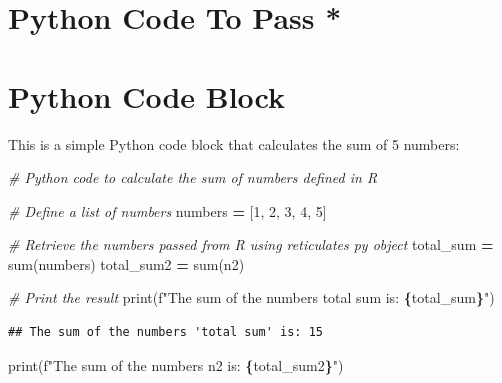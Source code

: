 \documentclass[
  12 pt,
  a4paper,
]{book}
\newenvironment{Shaded}{\begin{snugshade}}{\end{snugshade}}
\newcommand{\BuiltInTok}[1]{#1}
\newcommand{\CommentTok}[1]{\textcolor[rgb]{0.56,0.35,0.01}{\textit{#1}}}
\newcommand{\DecValTok}[1]{\textcolor[rgb]{0.00,0.00,0.81}{#1}}
\newcommand{\NormalTok}[1]{#1}
\newcommand{\OperatorTok}[1]{\textcolor[rgb]{0.81,0.36,0.00}{\textbf{#1}}}
\newcommand{\OtherTok}[1]{\textcolor[rgb]{0.56,0.35,0.01}{#1}}
\newcommand{\SpecialCharTok}[1]{\textcolor[rgb]{0.81,0.36,0.00}{\textbf{#1}}}
\newcommand{\SpecialStringTok}[1]{\textcolor[rgb]{0.31,0.60,0.02}{#1}}
\numberwithin{equation}{section}
\theoremstyle{plain}      %
\theoremstyle{definition} %
\theoremstyle{remark}     %
\theoremstyle{note}         %
\begin{document}
\hypertarget{python-code-to-pass}{%
\section{Python Code To Pass *}\label{python-code-to-pass}}

\begin{Shaded}
\end{Shaded}

\hypertarget{python-code-block}{%
\section{Python Code Block}\label{python-code-block}}

This is a simple Python code block that calculates the sum of 5 numbers:

\begin{Shaded}
\begin{Highlighting}[]
\CommentTok{\# Python code to calculate the sum of numbers defined in R}

\CommentTok{\# Define a list of numbers}
\NormalTok{numbers }\OperatorTok{=}\NormalTok{ [}\DecValTok{1}\NormalTok{, }\DecValTok{2}\NormalTok{, }\DecValTok{3}\NormalTok{, }\DecValTok{4}\NormalTok{, }\DecValTok{5}\NormalTok{]}

\CommentTok{\# Retrieve the numbers passed from R using reticulate\textquotesingle{}s \textquotesingle{}py\textquotesingle{} object}
\NormalTok{total\_sum }\OperatorTok{=} \BuiltInTok{sum}\NormalTok{(numbers)}
\NormalTok{total\_sum2 }\OperatorTok{=} \BuiltInTok{sum}\NormalTok{(n2)}

\CommentTok{\# Print the result}
\BuiltInTok{print}\NormalTok{(}\SpecialStringTok{f"The sum of the numbers \textquotesingle{}total sum\textquotesingle{} is: }\SpecialCharTok{\{}\NormalTok{total\_sum}\SpecialCharTok{\}}\SpecialStringTok{"}\NormalTok{)}
\end{Highlighting}
\end{Shaded}

\begin{verbatim}
## The sum of the numbers 'total sum' is: 15
\end{verbatim}

\begin{Shaded}
\begin{Highlighting}[]
\BuiltInTok{print}\NormalTok{(}\SpecialStringTok{f"The sum of the numbers \textquotesingle{}n2\textquotesingle{} is: }\SpecialCharTok{\{}\NormalTok{total\_sum2}\SpecialCharTok{\}}\SpecialStringTok{"}\NormalTok{)}
\end{Highlighting}
\end{Shaded}
\end{document}
